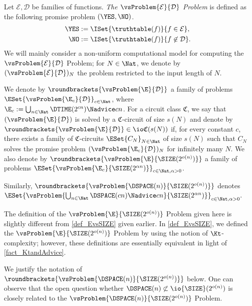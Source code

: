 \documentclass{toc}
\begin{document}
\begin{definition}
  Let $\mathcal{E}, \mathcal{D}$ be families of functions.
  \emph{The $\vsProblem{\mathcal{E}}{\mathcal{D}}$ Problem} is defined as the following promise problem $(\YES, \NO)$.
  \begin{align*}
    \YES & := \ISet{ \truthtable(f) }{ f \in \mathcal{E} },
    \\
    \NO  & := \ISet{ \truthtable(f) } { f \not\in \mathcal{D} }.
  \end{align*}
  We will mainly consider a non-uniform computational model for computing the $\vsProblem{\mathcal{E}}{\mathcal{D}}$ Problem;
  for $N \in \Nat$,
  we denote
  by $(\vsProblem{\mathcal{E}}{\mathcal{D}})_N$
  the problem restricted to the input length of $N$.

  We denote by $\roundbrackets{\vsProblem{\E}{\mathcal{D}}}$ a family of problems $\ESet { \vsProblem{\E_c }{\mathcal{D}} }_{c \in \Nat}$,
  where $\E_c := \bigcup_{n \in \Nat}  \DTIME(2^{c n}) \Nadvice c n$.
  For a circuit class $\mathfrak{C}$,
  we say that $(\vsProblem{\E}{\mathcal{D}})$ is solved by a $\mathfrak{C}$-circuit of size $s(N)$ and denote by
  $\roundbrackets{\vsProblem{\E}{\mathcal{D}}} \in \io\mathfrak{C}(s(N))$
  if, for every constant $c$, there exists a family of $\mathfrak{C}$-circuits $\ESet{ C_N }_{N \in \Nat}$ of size $s(N)$
  such that $C_N$ solves the promise problem $(\vsProblem{\E_c}{\mathcal{D}})_N$ for infinitely many $N$.
  We also denote by $\roundbrackets{\vsProblem{\E}{\SIZE(2^{o(n)})}}$
  a family of problems $\ESet{ \vsProblem{\E_c}{\SIZE(2^{\alpha n})} }_{c \in \Nat, \alpha > 0}$.

  Similarly, $\roundbrackets{\vsProblem{\DSPACE(n)}{\SIZE(2^{o(n)})}}$ denotes $\ESet { \vsProblem{\bigcup_{n \in \Nat}\DSPACE(c n) \Nadvice c n}{\SIZE(2^{\alpha n})} }_{c \in \Nat, \alpha > 0}.$
\end{definition}

The definition of the $\vsProblem{\E}{\SIZE(2^{o(n)})}$ Problem given here is slightly different from \cref{def_EvsSIZE} given earlier.
In \cref{def_EvsSIZE}, we defined the $\vsProblem{\E}{\SIZE(2^{o(n)})}$ Problem by using the notion of $\Kt$-complexity;
however,
these definitions are essentially equivalent in light of \cref{fact_KtandAdvice}.

We justify the notation of $\roundbrackets{\vsProblem{\DSPACE(n)}{\SIZE(2^{o(n)})}}$ below.
One can observe that
the open question %
%
whether $\DSPACE(n) \not\subset \io{\SIZE}(2^{o(n)})$
is closely related to the ${\vsProblem{\DSPACE(n)}{\SIZE(2^{o(n)})}}$ Problem.
%
%
\end{document}
